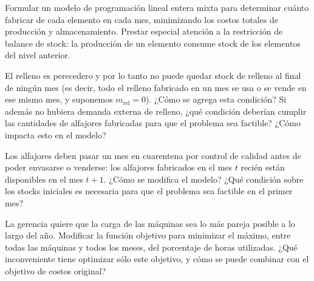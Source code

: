 \documentclass[11pt,a4paper]{article}
\begin{document}
\begin{puntos}
  \item Formular un modelo de programación lineal entera mixta para determinar
  cuánto fabricar de cada elemento en cada mes, minimizando los costos totales
  de producción y almacenamiento. Prestar especial atención a la restricción de
  balance de stock: la producción de un elemento consume stock de los elementos
  del nivel anterior.

  \item El relleno es perecedero y por lo tanto no puede quedar stock de relleno
  al final de ningún mes (es decir, todo el relleno fabricado en un mes se usa
  o se vende en ese mismo mes, y suponemos $m_{\mathrm{rel}} = 0$). ¿Cómo se
  agrega esta condición? Si además no
  hubiera demanda externa de relleno, ¿qué condición deberían cumplir las
  cantidades de alfajores fabricadas para que el problema sea factible? ¿Cómo
  impacta esto en el modelo?

  \item Los alfajores deben pasar un mes en cuarentena por control de calidad
  antes de poder envasarse o venderse: los alfajores fabricados en el mes $t$
  recién están disponibles en el mes $t+1$. ¿Cómo se modifica el modelo? ¿Qué
  condición sobre los stocks iniciales es necesaria para que el problema sea
  factible en el primer mes?

  \item La gerencia quiere que la carga de las máquinas sea lo más pareja
  posible a lo largo del año. Modificar la función objetivo para minimizar el
  máximo, entre todas las máquinas y todos los meses, del porcentaje de horas
  utilizadas. ¿Qué inconveniente tiene optimizar sólo este objetivo, y cómo se
  puede combinar con el objetivo de costos original?
\end{puntos}
\end{document}
